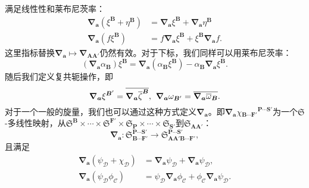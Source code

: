 满足线性性和莱布尼茨率：
\begin{equation*}
	\begin{aligned}
		\boldsymbol{\nabla }_{\boldsymbol{a}} (\xi ^{\boldsymbol{B}} +\eta ^{\boldsymbol{B}} ) & =\boldsymbol{\nabla }_{\boldsymbol{a}} \xi ^{\boldsymbol{B}} +\boldsymbol{\nabla }_{\boldsymbol{a}} \eta ^{\boldsymbol{B}}\\
		\boldsymbol{\nabla }_{\boldsymbol{a}} (f\xi ^{\boldsymbol{B}} ) & =f\boldsymbol{\nabla }_{\boldsymbol{a}} \xi ^{\boldsymbol{B}} +\xi ^{\boldsymbol{B}}\boldsymbol{\nabla }_{\boldsymbol{a}} f.
	\end{aligned}
\end{equation*}
这里指标替换$\boldsymbol{\nabla }_{\boldsymbol{a}} \mapsto \boldsymbol{\nabla }_{\boldsymbol{AA} '}$仍然有效。对于下标，我们同样可以用莱布尼茨率：
\begin{equation*}
	(\boldsymbol{\nabla }_{\boldsymbol{a}} \alpha _{\boldsymbol{B}} )\xi ^{\boldsymbol{B}} =\boldsymbol{\nabla }_{\boldsymbol{a}} (\alpha _{\boldsymbol{B}} \xi ^{\boldsymbol{B}} )-\alpha _{\boldsymbol{B}}\boldsymbol{\nabla }_{\boldsymbol{a}} \xi ^{\boldsymbol{B}} .
\end{equation*}
随后我们定义复共轭操作，即
\begin{equation*}
	\boldsymbol{\nabla }_{\boldsymbol{a}} \xi ^{\boldsymbol{B} '} =\overline{\boldsymbol{\nabla }_{\boldsymbol{a}}\overline{\zeta }^{\boldsymbol{B}}} ,\kern+0.4em \boldsymbol{\nabla }_{\boldsymbol{a}} \omega _{\boldsymbol{B} '} =\overline{\boldsymbol{\nabla }_{\boldsymbol{a}}\overline{\omega }_{\boldsymbol{B}}} .
\end{equation*}
对于一个一般的旋量，我们也可以通过这种方式定义$\boldsymbol{\nabla }_{\boldsymbol{a}}$。即$\boldsymbol{\nabla }_{\boldsymbol{a}} \chi {_{\boldsymbol{B} \cdots \boldsymbol{F} '}}^{\boldsymbol{P} \cdots \boldsymbol{S} '}$为一个$\mathfrak{S}$-多线性映射，从$\mathfrak{S}^{\boldsymbol{B}} \times \cdots \times \mathfrak{S}^{\boldsymbol{F} '} \times \mathfrak{S}_{\boldsymbol{P}} \times \cdots \times \mathfrak{S}_{\boldsymbol{S} '}$到$\mathfrak{S}_{\boldsymbol{AA} '}$：
\begin{equation*}
	\boldsymbol{\nabla }_{\boldsymbol{a}} :\mathfrak{S}_{\boldsymbol{B} \cdots \boldsymbol{F} '}^{\boldsymbol{P} \cdots \boldsymbol{S} '}\rightarrow \mathfrak{S}_{\boldsymbol{AA} '\boldsymbol{B} \cdots \boldsymbol{F} '}^{\boldsymbol{P} \cdots \boldsymbol{S} '} ,
\end{equation*}
且满足
\begin{equation*}
	\begin{aligned}
		\boldsymbol{\nabla }_{\boldsymbol{a}}( \psi _{\mathcal{D}} +\chi _{\mathcal{D}}) & =\boldsymbol{\nabla }_{\boldsymbol{a}} \psi _{\mathcal{D}} +\boldsymbol{\nabla }_{\boldsymbol{a}} \psi _{\mathcal{D}} ,\\
		\boldsymbol{\nabla }_{\boldsymbol{a}} (\psi _{\mathcal{D}} \phi _{\mathcal{C}} ) & =\psi _{\mathcal{D}}\boldsymbol{\nabla }_{\boldsymbol{a}} \phi _{\mathcal{C}} +\phi _{\mathcal{C}}\boldsymbol{\nabla }_{\boldsymbol{a}} \psi _{\mathcal{D}} .
	\end{aligned}
\end{equation*}
